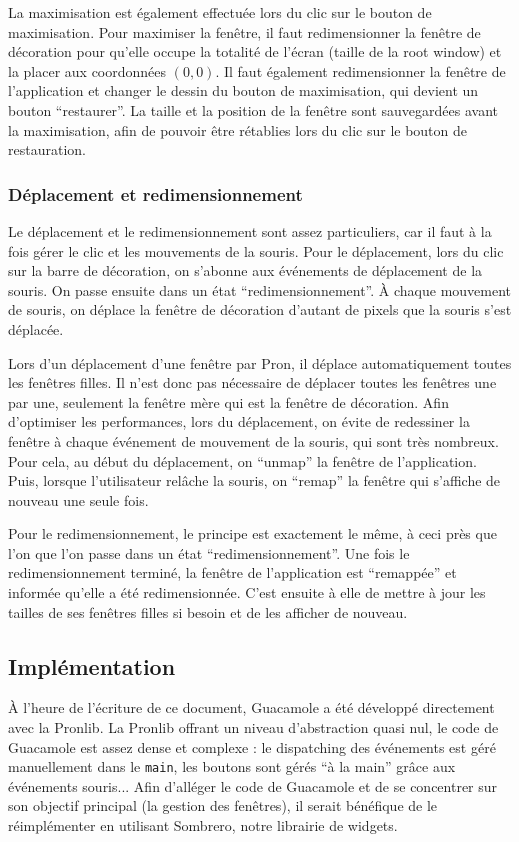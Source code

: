 La maximisation est également effectuée lors du clic sur le bouton de maximisation.
Pour maximiser la fenêtre, il faut redimensionner la fenêtre de décoration pour qu'elle occupe la totalité de l'écran (taille de la root window) et la placer aux coordonnées $(0, 0)$.
Il faut également redimensionner la fenêtre de l'application et changer le dessin du bouton de maximisation, qui devient un bouton ``restaurer''.
La taille et la position de la fenêtre sont sauvegardées avant la maximisation, afin de pouvoir être rétablies lors du clic sur le bouton de restauration.

\subsubsection{Déplacement et redimensionnement}

Le déplacement et le redimensionnement sont assez particuliers, car il faut à la fois gérer le clic et les mouvements de la souris.
Pour le déplacement, lors du clic sur la barre de décoration, on s'abonne aux événements de déplacement de la souris.
On passe ensuite dans un état ``redimensionnement''.
À chaque mouvement de souris, on déplace la fenêtre de décoration d'autant de pixels que la souris s'est déplacée.

Lors d'un déplacement d'une fenêtre par Pron, il déplace automatiquement toutes les fenêtres filles.
Il n'est donc pas nécessaire de déplacer toutes les fenêtres une par une, seulement la fenêtre mère qui est la fenêtre de décoration.
Afin d'optimiser les performances, lors du déplacement, on évite de redessiner la fenêtre à chaque événement de mouvement de la souris, qui sont très nombreux.
Pour cela, au début du déplacement, on ``unmap'' la fenêtre de l'application.
Puis, lorsque l'utilisateur relâche la souris, on ``remap'' la fenêtre qui s'affiche de nouveau une seule fois.

Pour le redimensionnement, le principe est exactement le même, à ceci près que l'on que l'on passe dans un état ``redimensionnement''.
Une fois le redimensionnement terminé, la fenêtre de l'application est ``remappée'' et informée qu'elle a été redimensionnée.
C'est ensuite à elle de mettre à jour les tailles de ses fenêtres filles si besoin et de les afficher de nouveau.

\subsection{Implémentation}

À l'heure de l'écriture de ce document, Guacamole a été développé directement avec la Pronlib.
La Pronlib offrant un niveau d'abstraction quasi nul, le code de Guacamole est assez dense et complexe : le dispatching des événements est géré manuellement dans le \verb|main|, les boutons sont gérés ``à la main'' grâce aux événements souris...
Afin d'alléger le code de Guacamole et de se concentrer sur son objectif principal (la gestion des fenêtres), il serait bénéfique de le réimplémenter en utilisant Sombrero, notre librairie de widgets.
